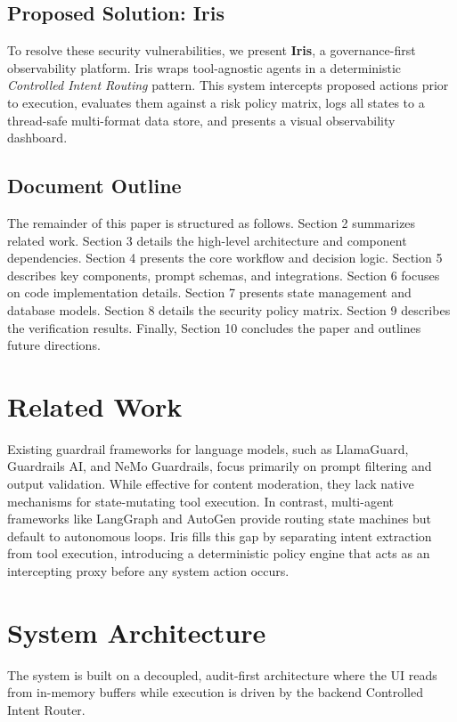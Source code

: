 \documentclass{article}
\begin{document}
\subsection{Proposed Solution: Iris}
To resolve these security vulnerabilities, we present \textbf{Iris}, a governance-first observability platform. Iris wraps tool-agnostic agents in a deterministic \textit{Controlled Intent Routing} pattern. This system intercepts proposed actions prior to execution, evaluates them against a risk policy matrix, logs all states to a thread-safe multi-format data store, and presents a visual observability dashboard. 

\subsection{Document Outline}
The remainder of this paper is structured as follows. Section 2 summarizes related work. Section 3 details the high-level architecture and component dependencies. Section 4 presents the core workflow and decision logic. Section 5 describes key components, prompt schemas, and integrations. Section 6 focuses on code implementation details. Section 7 presents state management and database models. Section 8 details the security policy matrix. Section 9 describes the verification results. Finally, Section 10 concludes the paper and outlines future directions.

\section{Related Work}
Existing guardrail frameworks for language models, such as LlamaGuard, Guardrails AI, and NeMo Guardrails, focus primarily on prompt filtering and output validation. While effective for content moderation, they lack native mechanisms for state-mutating tool execution. In contrast, multi-agent frameworks like LangGraph and AutoGen provide routing state machines but default to autonomous loops. Iris fills this gap by separating intent extraction from tool execution, introducing a deterministic policy engine that acts as an intercepting proxy before any system action occurs.

\section{System Architecture}

The system is built on a decoupled, audit-first architecture where the UI reads from in-memory buffers while execution is driven by the backend Controlled Intent Router.
\end{document}
